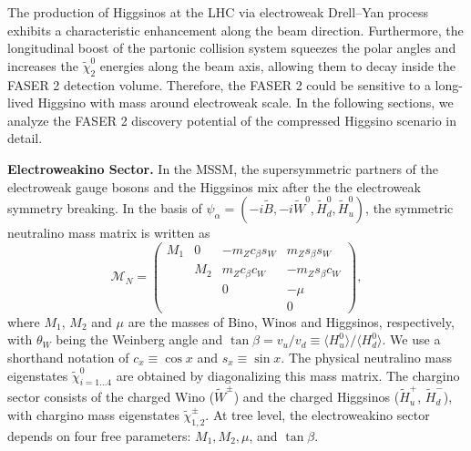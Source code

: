 \documentclass[
    twocolumn,
    superscriptaddress,
    amsmath, 
    amssymb,
    aps,
    reprint,
    floatfix
]{revtex4-2}
\begin{document}
The production of Higgsinos at the LHC  via electroweak Drell–Yan process exhibits a characteristic enhancement along the beam direction. Furthermore, the longitudinal boost of the partonic collision system squeezes the polar angles and increases the $\tilde{\chi}_2^0$ energies along the beam axis, allowing them to decay inside the FASER 2 detection volume.
Therefore, the FASER 2 could be sensitive to a long-lived Higgsino with mass around electroweak scale. In the following sections, we analyze the FASER 2 discovery potential of the compressed Higgsino scenario in detail.


\vspace{0.5em}\noindent
\textbf{Electroweakino Sector.}
\label{sec:model}
% 
In the MSSM, the supersymmetric partners of the electroweak gauge bosons  and the Higgsinos mix after the the electroweak symmetry breaking.  In the basis of $\psi_\alpha = (-i\tilde{B}, -i\tilde{W}^0, \tilde{H}_d^0, \tilde{H}_u^0)$, the symmetric neutralino mass matrix is written as  
\begin{equation}
\label{eq:massmatrix0}
\mathcal{M}_N =
	\begin{pmatrix}
	M_1 & 0 & -m_Z c_{\beta} s_{W} & m_Z s_{\beta} s_{W} \\
	& M_2 & m_Z c_{\beta} c_{W} & -m_Z s_{\beta} c_{W} \\
	 &  & 0 & -\mu \\
	 & & & 0
	\end{pmatrix}, 
\end{equation}
where $M_1$, $M_2$ and $\mu$ are the masses of Bino, Winos and Higgsinos, respectively, with $\theta_W$ being the Weinberg angle and $\tan\beta = v_u / v_d \equiv \langle {H}_u^0\rangle/\langle {H}_d^0\rangle$.  We use a shorthand notation of $c_x\equiv\cos x$ and $s_x\equiv\sin x$. The physical neutralino mass eigenstates $\tilde{\chi}_{i=1\ldots 4}^0$ are obtained by diagonalizing this mass matrix. 
% 
The chargino sector consists of the charged Wino ($\tilde{W}^\pm$) and the charged Higgsinos ($\tilde{H}_u^+$, $\tilde{H}_d^-$), with chargino mass eigenstates $\tilde{\chi}_{1,2}^\pm$. At tree level, the electroweakino sector depends on four free  parameters: $M_1, M_2,  \mu$, and $\tan{\beta}$. 
\end{document}

